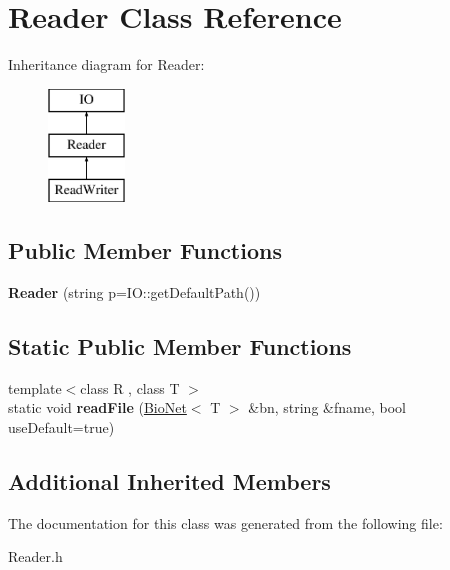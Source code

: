 \hypertarget{class_reader}{}\section{Reader Class Reference}
\label{class_reader}
Inheritance diagram for Reader\+:\begin{figure}[H]
\begin{center}
\leavevmode
\includegraphics[height=3.000000cm]{class_reader}
\end{center}
\end{figure}
\subsection*{Public Member Functions}
\begin{DoxyCompactItemize}
\item 
\mbox{\label{class_reader_ae6cad7214cf6b6a26fb48a650f8dd8b3}} 
{\bfseries Reader} (string p=I\+O\+::get\+Default\+Path())
\end{DoxyCompactItemize}
\subsection*{Static Public Member Functions}
\begin{DoxyCompactItemize}
\item 
\mbox{\label{class_reader_a455679a18e5019c366a3b409171a358e}} 
{\footnotesize template$<$class R , class T $>$ }\\static void {\bfseries read\+File} (\hyperlink{class_bio_net}{Bio\+Net}$<$ T $>$ \&bn, string \&fname, bool use\+Default=true)
\end{DoxyCompactItemize}
\subsection*{Additional Inherited Members}


The documentation for this class was generated from the following file\+:\begin{DoxyCompactItemize}
\item 
Reader.\+h\end{DoxyCompactItemize}

